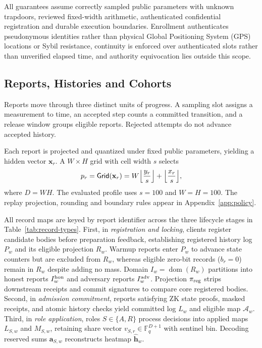 \documentclass[conference,compsoc]{IEEEtran}
\theoremstyle{definition}
\numberwithin{equation}{section}
\numberwithin{table}{section}
\numberwithin{figure}{section}
\theoremstyle{plain}
\begin{document}
All guarantees assume correctly sampled public parameters with unknown trapdoors, reviewed fixed-width arithmetic, authenticated confidential registration and durable execution boundaries. Enrollment authenticates pseudonymous identities rather than physical Global Positioning System (GPS) locations or Sybil resistance, continuity is enforced over authenticated slots rather than unverified elapsed time, and authority equivocation lies outside this scope.

\subsection{Reports, Histories and Cohorts}
\label{sec:prelim-model}

Reports move through three distinct units of progress. A sampling slot assigns a measurement to time, an accepted step counts a committed transition, and a release window groups eligible reports. Rejected attempts do not advance accepted history.

Each report is projected and quantized under fixed public parameters, yielding a hidden vector \(\mathbf{x}_r\). A \(W\times H\) grid with cell width \(s\) selects
\begin{equation}
  p_r=\mathsf{Grid}(\mathbf{x}_r)
  =W\Bigl\lfloor\frac{y_r}{s}\Bigr\rfloor+\Bigl\lfloor\frac{x_r}{s}\Bigr\rfloor,
  \label{eq:canonical-grid}
\end{equation}
where \(D=WH\). The evaluated profile uses \(s=100\) and \(W=H=100\). The replay projection, rounding and boundary rules appear in Appendix~\ref{app:policy}.

All record maps are keyed by report identifier across the three lifecycle stages in Table~\ref{tab:record-types}.
First, in \emph{registration and locking}, clients register candidate bodies before preparation feedback, establishing registered history log \(P_w\) and its eligible projection \(R_w\). Warmup reports enter \(P_w\) to advance state counters but are excluded from \(R_w\), whereas eligible zero-bit records (\(b_r=0\)) remain in \(R_w\) despite adding no mass. Domain \(I_w=\operatorname{dom}(R_w)\) partitions into honest reports \(I_w^{\rm hon}\) and adversary reports \(I_w^{\rm adv}\). Projection \(\pi_{\rm reg}\) strips downstream receipts and commit signatures to compare core registered bodies.
Second, in \emph{admission commitment}, reports satisfying ZK state proofs, masked receipts, and atomic history checks yield committed log \(L_w\) and eligible map \(\mathcal A_w\).
Third, in \emph{role application}, roles \(S\in\{A,R\}\) process decisions into applied maps \(L_{S,w}\) and \(M_{S,w}\), retaining share vector \(v_{S,r}\in\mathbb F_q^{D+1}\) with sentinel bin. Decoding reserved sums \(\mathbf a_{S,w}\) reconstructs heatmap \(\hat{\mathbf h}_w\).
\end{document}
